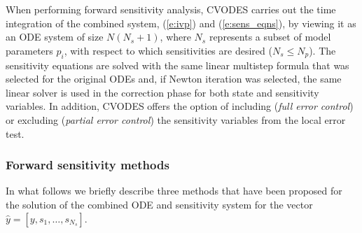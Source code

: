 When performing forward sensitivity analysis, CVODES carries out the time integration 
of the combined system, (\ref{e:ivp}) and (\ref{e:sens_eqns}), by viewing it as an ODE
system of size $N(N_s+1)$, where $N_s$ represents a subset of model parameters $p_i$, 
with respect to which sensitivities are desired ($N_s \le N_p$). 
The sensitivity equations are solved with the same linear multistep formula that
was selected for the original ODEs and, if Newton iteration was selected, the
same linear solver is used in the correction phase for both state and sensitivity 
variables. In addition, CVODES offers the option of including
({\em full error control}) or excluding
({\em partial error control}) the sensitivity variables from the local 
error test.

\subsubsection{Forward sensitivity methods}
In what follows we briefly describe three methods that have been proposed for the 
solution of the combined ODE and sensitivity system for the vector
${\hat y} = [y, s_1, \ldots , s_{N_s}]$.


